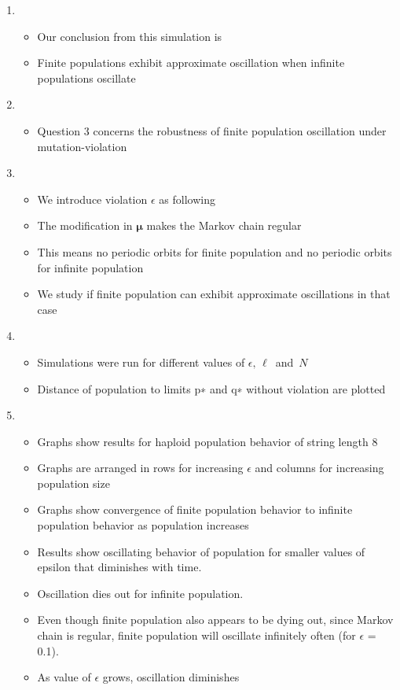 \documentclass{article}
\begin{document}
\begin{enumerate}
\item
  \begin{itemize}
  \item Our conclusion from this simulation is
   \item Finite populations exhibit approximate oscillation when
     infinite populations oscillate
  \end{itemize}
  
\item
  \begin{itemize}
  \item Question 3 concerns the robustness of finite population oscillation under mutation-violation
  
  \end{itemize}

\item
  \begin{itemize}
  \item We introduce violation $\epsilon$ as following
  \item The modification in $\bm{\mu}$ makes the Markov chain regular
  \item This means no periodic orbits for finite population and no periodic orbits for infinite population
  \item We study if finite population can exhibit approximate oscillations in that case 
  \end{itemize}
  
\item
  \begin{itemize}
  \item Simulations were run for different values of $\epsilon,\, \ell \,$ and $\, N$
  \item Distance of population to limits p∗ and q∗ without violation are plotted  
  \end{itemize}
  
\item
  \begin{itemize}
  \item Graphs show results for haploid population behavior of string length 8
  \item Graphs are arranged in rows for increasing $\epsilon$ and columns for increasing population size
  \item Graphs show convergence of finite population behavior to infinite population behavior as population increases
  \item Results show oscillating behavior of population for smaller values of epsilon that diminishes with time.
  \item Oscillation dies out for infinite population.
  \item Even though finite population also appears to be dying out, since Markov chain is regular, 
  finite population will oscillate infinitely often (for $\epsilon$ = 0.1).
  \item As value of $\epsilon$ grows, oscillation diminishes
  

\end{itemize}
\end{enumerate}
\end{document}
